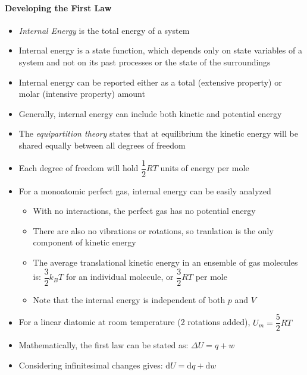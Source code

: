\documentclass[12pt, openany, letterpaper]{memoir}
\begin{document}
\paragraph{Developing the First Law}
\begin{itemize}
	\item \emph{Internal Energy} is the total energy of a system
	\item Internal energy is a state function, which depends only on state variables of a system and not on its past processes or the state of the surroundings
	\item Internal energy can be reported either as a total (extensive property) or molar (intensive property) amount
	\item Generally, internal energy can include both kinetic and potential energy
	\item The \emph{equipartition theory} states that at equilibrium the kinetic energy will be shared equally between all degrees of freedom
	\item Each degree of freedom will hold $\dfrac{1}{2}RT$ units of energy per mole
	\item For a monoatomic perfect gas, internal energy can be easily analyzed
	\begin{itemize}
		\item With no interactions, the perfect gas has no potential energy
		\item There are also no vibrations or rotations, so tranlation is the only component of kinetic energy
		\item The average translational kinetic energy in an ensemble of gas molecules is: $\dfrac{3}{2}k_BT$ for an individual molecule, or $\dfrac{3}{2}RT$ per mole
		\item Note that the internal energy is independent of both $p$ and $V$
	\end{itemize}
	\item For a linear diatomic at room temperature (2 rotations added), $U_m = \dfrac{5}{2}RT$
	\item Mathematically, the first law can be stated as: $\Delta U = q + w$
	\item Considering infinitesimal changes gives: $\mathrm{d}U = \mathrm{d}q + \mathrm{d}w$
\end{itemize}
\end{document}
